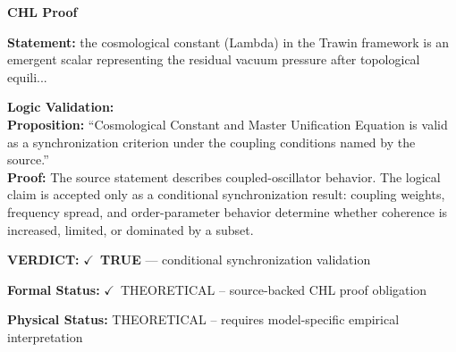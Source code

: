 \vspace{0.45em}
\noindent\textbf{CHL Proof}\par
\textbf{Statement:} the cosmological constant (Lambda) in the Trawin framework is an emergent scalar
representing the residual vacuum pressure after topological equili...

\textbf{Logic Validation:}\\
\textbf{Proposition:} ``Cosmological Constant and Master Unification Equation is valid as a synchronization
criterion under the coupling conditions named by the source.''\\
\textbf{Proof:} The source statement describes coupled-oscillator behavior. The logical claim is
accepted only as a conditional synchronization result: coupling weights, frequency
spread, and order-parameter behavior determine whether coherence is increased, limited,
or dominated by a subset.

\textbf{VERDICT:} \ensuremath{\checkmark}\ \textbf{TRUE} --- conditional synchronization validation

\textbf{Formal Status:} \ensuremath{\checkmark}\ THEORETICAL -- source-backed CHL proof obligation

\textbf{Physical Status:} THEORETICAL -- requires model-specific empirical interpretation
\par\vspace{0.45em}
\par
\ifTZPDarkEdition
{}
\fi
\endgroup
\endgroup
